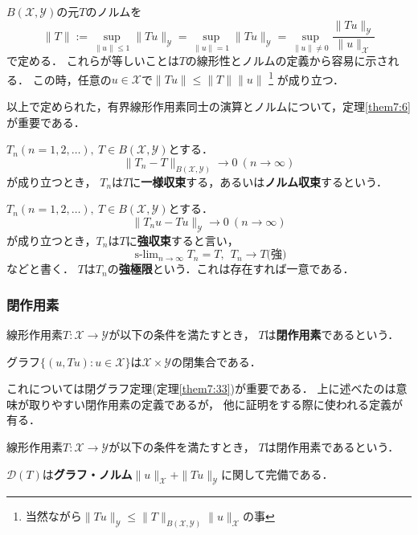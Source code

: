 \documentclass[a4j]{jarticle}
\newcommand{\dom}{\mathscr{D}}
\newcommand{\spB}[2]{B(\mathscr{#1}, \mathscr{#2})}
\newcommand{\spX}{\mathscr{X}}
\newcommand{\spY}{\mathscr{Y}}
\begin{document}
    \begin{Def}
        $\spB{X}{Y}$の元$T$のノルムを
        \[
            \|T\|
            :=\sup_{\|u\| \leq 1}{\|Tu\|_{\spY}}
            =\sup_{\|u\|=1}{\|Tu\|_{\spY}}
            =\sup_{\|u\| \neq 0}{ \frac{\|Tu\|_{\spY}}{\|u\|_{\spX}} }
        \]
        で定める．
        これらが等しいことは$T$の線形性とノルムの定義から容易に示される．
        この時，任意の$u \in \spX$で$\|Tu\| \leq \|T\| \|u\|$
        \footnote{当然ながら$\|Tu\|_{\spY} \leq \|T\|_{\spB{X}{Y}} \|u\|_{\spX} $の事}
        が成り立つ．
    \end{Def}
    以上で定められた，有界線形作用素同士の演算とノルムについて，定理\ref{them7:6}が重要である．

    \begin{Def}
        $T_n (n=1,2,\dots),~ T \in \spB{X}{Y}$とする．
        \[ \|T_n-T\|_{\spB{X}{Y}} \to 0 ~(n \to \infty) \]
        が成り立つとき，
        $T_n$は$T$に\textbf{一様収束}する，あるいは\textbf{ノルム収束}するという．
    \end{Def}
    \begin{Def}
        $T_n (n=1,2,\dots),~ T \in \spB{X}{Y}$とする．
        \[ \|T_n u-T u\|_{\spY} \to 0 ~(n \to \infty) \]
        が成り立つとき，$T_n$は$T$に\textbf{強収束}すると言い，
        \[ \operatorname{s-lim}_{n \to \infty}{T_n}=T,~~ T_n \to T \mbox{(強)} \]
        などと書く．
        $T$は$T_n$の\textbf{強極限}という．これは存在すれば一意である．
    \end{Def}
    \begin{Def}
    \end{Def}

    \subsubsection{閉作用素}
    \begin{Def}[閉作用素/1]
        線形作用素$T: \spX \to \spY$が以下の条件を満たすとき，
        $T$は\textbf{閉作用素}であるという．
        \begin{center}
            グラフ$\{ (u, Tu) : u \in \spX \}$は$\spX \times \spY$の閉集合である．
        \end{center}
    \end{Def}
    これについては閉グラフ定理(定理\ref{them7:33})が重要である．
    上に述べたのは意味が取りやすい閉作用素の定義であるが，
    他に証明をする際に使われる定義が有る．
    \begin{Def}[閉作用素/2]
        線形作用素$T: \spX \to \spY$が以下の条件を満たすとき，
        $T$は閉作用素であるという．
        \begin{center}
            $\dom(T)$は\textbf{グラフ・ノルム}$\|u\|_{\spX}+\|Tu\|_\spY$に関して完備である．
        \end{center}
    \end{Def}
\end{document}

